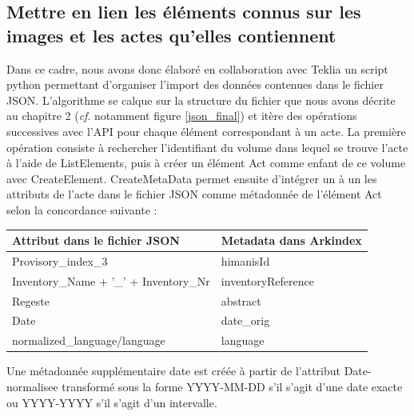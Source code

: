 \documentclass[a4paper,12pt,twoside]{book}
\begin{document}
	\subsection{Mettre en lien les éléments connus sur les images et les actes qu'elles contiennent}
	
	Dans ce cadre, nous avons donc élaboré en collaboration avec Teklia un script python permettant d'organiser l'import des données contenues dans le fichier JSON. L'algorithme se calque sur la structure du fichier que nous avons décrite au chapitre 2 (\textit{cf}. notamment figure \ref{json_final}) et itère des opérations successives avec l'API pour chaque élément correspondant à un acte. La première opération consiste à rechercher l'identifiant du volume dans lequel se trouve l'acte à l'aide de ListElements, puis à créer un élément Act comme enfant de ce volume avec CreateElement. CreateMetaData permet ensuite d'intégrer un à un les attributs de l'acte dans le fichier JSON comme métadonnée de l'élément Act selon la concordance suivante :
	
	\begin{center}
		\begin{tabular}{|p{8cm}|p{8cm}|}
			\hline
			Attribut dans le fichier JSON & Metadata dans Arkindex\\
			\hline\hline
			Provisory\_index\_3 & himanisId \\ \hline
			Inventory\_Name + '\_' + Inventory\_Nr & inventoryReference \\ \hline
			Regeste & abstract \\ \hline
			Date & date\_orig \\ \hline
			normalized\_language/language & language \\ \hline
		\end{tabular}
	\end{center}

	\noindent Une métadonnée supplémentaire \og date\fg{} est créée à partir de l'attribut \og Date-normalisee\fg{} transformé sous la forme YYYY-MM-DD s'il s'agit d'une date exacte ou YYYY-YYYY s'il s'agit d'un intervalle.
	
\end{document}

